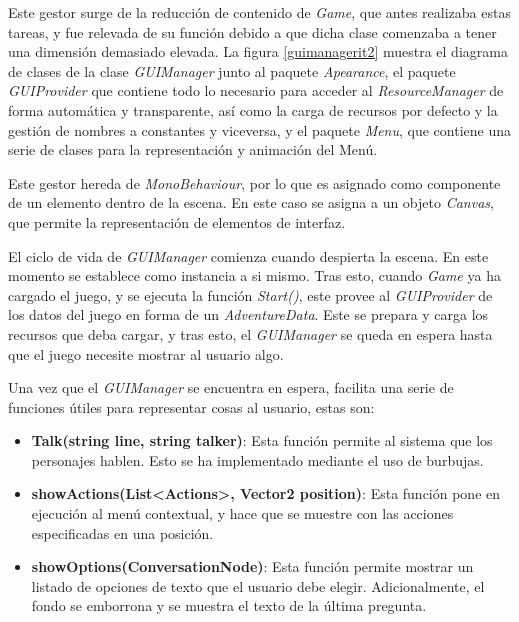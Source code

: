 Este gestor surge de la reducción de contenido de \textit{Game}, que antes realizaba estas tareas, y fue relevada de su función debido a que dicha clase comenzaba a tener una dimensión demasiado elevada. La figura \ref{guimanagerit2} muestra el diagrama de clases de la clase \textit{GUIManager} junto al paquete \textit{Apearance}, el paquete \textit{GUIProvider} que contiene todo lo necesario para acceder al \textit{ResourceManager} de forma automática y transparente, así como la carga de recursos por defecto y la gestión de nombres a constantes y viceversa, y el paquete \textit{Menu}, que contiene una serie de clases para la representación y animación del Menú.

Este gestor hereda de \textit{MonoBehaviour}, por lo que es asignado como componente de un elemento dentro de la escena. En este caso se asigna a un objeto \textit{Canvas}, que permite la representación de elementos de interfaz. 

El ciclo de vida de \textit{GUIManager} comienza cuando despierta la escena. En este momento se establece como instancia a si mismo. Tras esto, cuando \textit{Game} ya ha cargado el juego, y se ejecuta la función \textit{Start()}, este provee al \textit{GUIProvider} de los datos del juego en forma de un \textit{AdventureData}. Este se prepara y carga los recursos que deba cargar, y tras esto, el \textit{GUIManager} se queda en espera hasta que el juego necesite mostrar al usuario algo.

Una vez que el \textit{GUIManager} se encuentra en espera, facilita una serie de funciones útiles para representar cosas al usuario, estas son:
\begin{itemize}
	\item \textbf{Talk(string line, string talker)}: Esta función permite al sistema que los personajes hablen. Esto se ha implementado mediante el uso de burbujas.
	
	\item \textbf{showActions(List<Actions>, Vector2 position)}: Esta función pone en ejecución al menú contextual, y hace que se muestre con las acciones especificadas en una posición.
	
	\item \textbf{showOptions(ConversationNode)}: Esta función permite mostrar un listado de opciones de texto que el usuario debe elegir. Adicionalmente, el fondo se emborrona y se muestra el texto de la última pregunta.
	
\end{itemize}


